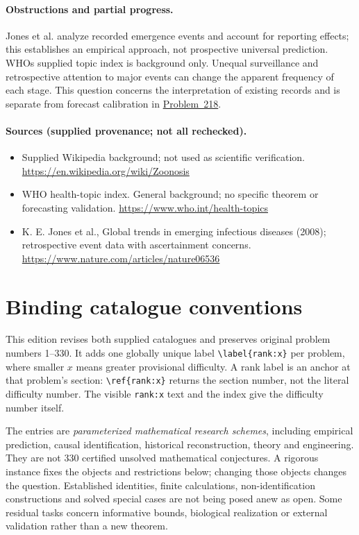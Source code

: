 \documentclass[11pt]{article}
\begin{document}
\paragraph{Obstructions and partial progress.} Jones et al. analyze recorded emergence events and account for reporting effects; this establishes an empirical approach, not prospective universal prediction. WHO\textquotesingle s supplied topic index is background only. Unequal surveillance and retrospective attention to major events can change the apparent frequency of each stage. This question concerns the interpretation of existing records and is separate from forecast calibration in \href{https://we-solve.github.io/problems/forecasting-pathogen-emergence-17a46a34/}{Problem~218}.
\paragraph{Sources (supplied provenance; not all rechecked).}
\begin{itemize}
\item Supplied Wikipedia background; not used as scientific verification. \url{https://en.wikipedia.org/wiki/Zoonosis}
\item WHO health-topic index. General background; no specific theorem or forecasting validation. \url{https://www.who.int/health-topics}
\item K. E. Jones et al., Global trends in emerging infectious diseases (2008); retrospective event data with ascertainment concerns. \url{https://www.nature.com/articles/nature06536}
\end{itemize}


\section*{Binding catalogue conventions}
This edition revises both supplied catalogues and preserves original problem numbers 1--330. It adds one globally unique label \verb|\label{rank:x}| per problem, where smaller $x$ means greater provisional difficulty. A rank label is an anchor at that problem's section: \verb|\ref{rank:x}| returns the section number, not the literal difficulty number. The visible \texttt{rank:x} text and the index give the difficulty number itself.

The entries are \emph{parameterized mathematical research schemes}, including empirical prediction, causal identification, historical reconstruction, theory and engineering. They are not 330 certified unsolved mathematical conjectures. A rigorous instance fixes the objects and restrictions below; changing those objects changes the question. Established identities, finite calculations, non-identification constructions and solved special cases are not being posed anew as open. Some residual tasks concern informative bounds, biological realization or external validation rather than a new theorem.
\end{document}
